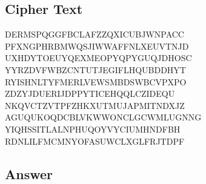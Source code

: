 \documentclass[10pt]{article}
\begin{document}
\subsection{Cipher Text}
DERMSPQGGFBCLAFZZQXICUBJWNPACC
PFXNGPHRBMWQSJIWWAFFNLXEUVTNJD
UXHDYTOEUYQEXMEOPYQPYGUQJDHOSC
YYRZDVFWBZCNTUTJEGIFLHQUBDDHYT
RYISHNLTYFMERLVEWSMBDSWBCVPXPO
ZDZYJDUERIJDPPYTICEHQQLCZIDEQU
NKQVCTZVTPFZHKXUTMUJAPMITNDXJZ
AGUQUKOQDCBLVKWWONCLGCWMLUGNNG
YIQHSSITLALNPHUQOYVYCIUMHNDFBH
RDNLILFMCMNYOFASUWCLXGLFRJTDPF

\subsection{Answer}
\end{document}
